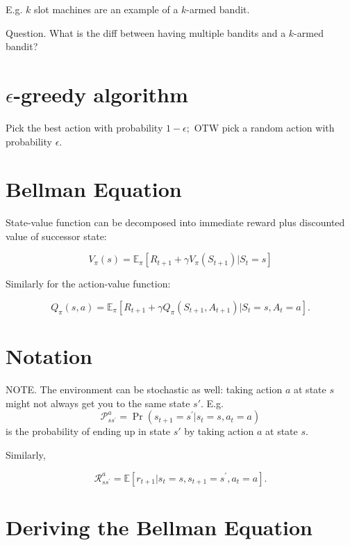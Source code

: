 \documentclass[17pt]{extarticle}
\theoremstyle{plain}
\theoremstyle{definition}
\theoremstyle{remark}
\newcommand{\0}{\varnothing}
\newcommand{\<}{\langle}
\renewcommand{\>}{\rangle}
\begin{document}
E.g. \( k \) slot machines are an example of a \( k \)-armed bandit.

Question. What is the diff between having multiple bandits and a \( k \)-armed
bandit?

\section{\( \epsilon \)-greedy algorithm}

Pick the best action with probability \( 1 - \epsilon; \) OTW pick a random
action with probability $ \epsilon. $

\section{Bellman Equation}


State-value function can be decomposed into immediate reward plus discounted value of successor state:


\[
V _ { \pi } ( s ) = \mathbb { E } _ { \pi } \left[ R _ { t + 1 } + \gamma V _ { \pi } \left( S _ { t + 1 } \right) | S _ { t } = s \right]
\]

Similarly for the action-value function:

\[
Q _ { \pi } ( s , a ) = \mathbb { E } _ { \pi } \left[ R _ { t + 1 } + \gamma Q _ { \pi } \left( S _ { t + 1 } , A _ { t + 1 } \right) | S _ { t } = s , A _ { t } = a \right].
\]

\section{Notation}


NOTE. The environment can be stochastic as well: taking action \( a \) at state \( s \) might not always get you to the same state \( s'. \) E.g.
\[
\mathcal { P } _ { s s ^ { \prime } } ^ { a } = \operatorname { Pr } \left( s _ { t + 1 } = s ^ { \prime } | s _ { t } = s , a _ { t } = a \right)
\]
is the probability of ending up in state \( s' \) by taking action \( a \) at state \( s. \)

Similarly,

\[
\mathcal { R } _ { s s ^ { \prime } } ^ { a } = \mathbb { E } \left[ r _ { t + 1 } | s _ { t } = s , s _ { t + 1 } = s ^ { \prime } , a _ { t } = a \right].
\]

\section{Deriving the Bellman Equation}
\end{document}
